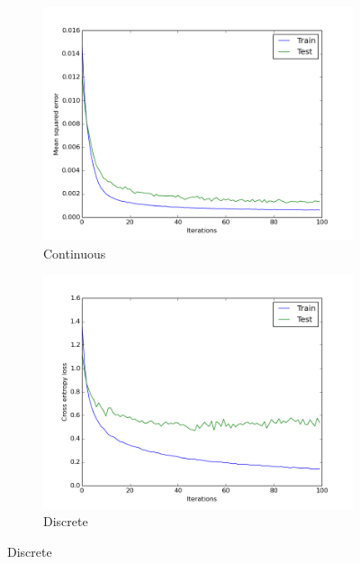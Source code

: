 \documentclass[a4paper,11pt]{report}
\begin{document}
\begin{figure}[t]
	\centering
      \begin{subfigure}[b]{0.45\columnwidth}

    \includegraphics[clip=true,width=1.\textwidth]{figures/mse.png}
    \caption{Continuous}
    \label{fig:cont_results}
  \end{subfigure}
  \begin{subfigure}[b]{0.45\columnwidth}
    \includegraphics[clip=true,width=1.\textwidth]{figures/d_xent.png}
    \caption{Discrete}
    \label{fig:discrete_results}
  \end{subfigure} 
  

\end{figure}
\end{document}
